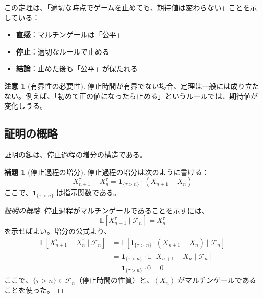 \documentclass[12pt,a4paper]{article}
\theoremstyle{definition}
\newtheorem{lemma}[definition]{補題}
\newtheorem{remark}[definition]{注意}
\newcommand{\E}{\mathbb{E}}
\newcommand{\cF}{\mathcal{F}}
\begin{document}
この定理は、「適切な時点でゲームを止めても、期待値は変わらない」ことを示している：

\begin{itemize}
\item \textbf{直感}：マルチンゲールは「公平」
\item \textbf{停止}：適切なルールで止める
\item \textbf{結論}：止めた後も「公平」が保たれる
\end{itemize}

\begin{remark}[有界性の必要性]
停止時間が有界でない場合、定理は一般には成り立たない。例えば、「初めて正の値になったら止める」というルールでは、期待値が変化しうる。
\end{remark}

\subsection{証明の概略}

証明の鍵は、停止過程の増分の構造である。

\begin{lemma}[停止過程の増分]
停止過程の増分は次のように書ける：
\[
X^\tau_{n+1} - X^\tau_n = \mathbf{1}_{\{\tau > n\}} \cdot (X_{n+1} - X_n)
\]
ここで、$\mathbf{1}_{\{\tau > n\}}$ は指示関数である。
\end{lemma}

\begin{center}
\end{center}

\begin{proof}[証明の概略]
停止過程がマルチンゲールであることを示すには、
\[
\E[X^\tau_{n+1} \mid \cF_n] = X^\tau_n
\]
を示せばよい。増分の公式より、
\begin{align*}
\E[X^\tau_{n+1} - X^\tau_n \mid \cF_n] 
&= \E[\mathbf{1}_{\{\tau > n\}} \cdot (X_{n+1} - X_n) \mid \cF_n] \\
&= \mathbf{1}_{\{\tau > n\}} \cdot \E[X_{n+1} - X_n \mid \cF_n] \\
&= \mathbf{1}_{\{\tau > n\}} \cdot 0 = 0
\end{align*}
ここで、$\{\tau > n\} \in \cF_n$（停止時間の性質）と、$(X_n)$ がマルチンゲールであることを使った。
\end{proof}
\end{document}
